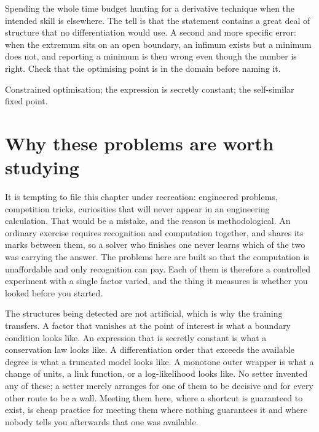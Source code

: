\begin{trap}
Spending the whole time budget hunting for a derivative technique when the intended skill is elsewhere. The tell is that the statement contains a great deal of structure that no differentiation would use. A second and more specific error: when the extremum sits on an open boundary, an infimum exists but a minimum does not, and reporting a minimum is then wrong even though the number is right. Check that the optimising point is in the domain before naming it.
\end{trap}

\begin{seealsob}Constrained optimisation; the expression is secretly constant; the self-similar fixed point.\end{seealsob}

\section{Why these problems are worth studying}

It is tempting to file this chapter under recreation: engineered problems, competition tricks, curiosities that will never appear in an engineering calculation. That would be a mistake, and the reason is methodological. An ordinary exercise requires recognition and computation together, and shares its marks between them, so a solver who finishes one never learns which of the two was carrying the answer. The problems here are built so that the computation is unaffordable and only recognition can pay. Each of them is therefore a controlled experiment with a single factor varied, and the thing it measures is whether you looked before you started.

The structures being detected are not artificial, which is why the training transfers. A factor that vanishes at the point of interest is what a boundary condition looks like. An expression that is secretly constant is what a conservation law looks like. A differentiation order that exceeds the available degree is what a truncated model looks like. A monotone outer wrapper is what a change of units, a link function, or a log-likelihood looks like. No setter invented any of these; a setter merely arranges for one of them to be decisive and for every other route to be a wall. Meeting them here, where a shortcut is guaranteed to exist, is cheap practice for meeting them where nothing guarantees it and where nobody tells you afterwards that one was available.

